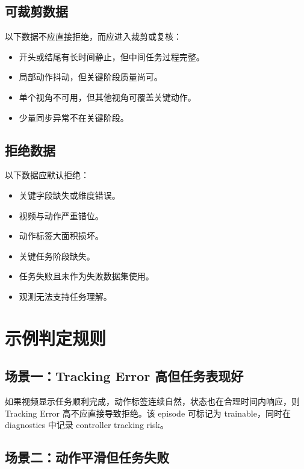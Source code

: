 \documentclass[UTF8,zihao=-4,oneside,openany]{ctexrep}
\begin{document}
\subsection{可裁剪数据}

以下数据不应直接拒绝，而应进入裁剪或复核：

\begin{itemize}
  \item 开头或结尾有长时间静止，但中间任务过程完整。
  \item 局部动作抖动，但关键阶段质量尚可。
  \item 单个视角不可用，但其他视角可覆盖关键动作。
  \item 少量同步异常不在关键阶段。
\end{itemize}

\subsection{拒绝数据}

以下数据应默认拒绝：

\begin{itemize}
  \item 关键字段缺失或维度错误。
  \item 视频与动作严重错位。
  \item 动作标签大面积损坏。
  \item 关键任务阶段缺失。
  \item 任务失败且未作为失败数据集使用。
  \item 观测无法支持任务理解。
\end{itemize}

\section{示例判定规则}

\subsection{场景一：Tracking Error 高但任务表现好}

如果视频显示任务顺利完成，动作标签连续自然，状态也在合理时间内响应，则 Tracking Error 高不应直接导致拒绝。该 episode 可标记为 trainable，同时在 diagnostics 中记录 controller tracking risk。

\subsection{场景二：动作平滑但任务失败}
\end{document}

